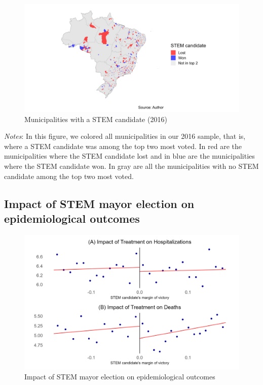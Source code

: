 \documentclass[
  letterpaper,
  DIV=11,
  numbers=noendperiod]{scrartcl}
\begin{document}
\begin{figure}[H]

\caption{Municipalities with a STEM candidate (2016)}

{\centering \includegraphics{outputs/figures/mapa_stem_municipios_2016.png}

}

\end{figure}%

\emph{Notes}: In this figure, we colored all municipalities in our 2016
sample, that is, where a STEM candidate was among the top two most
voted. In red are the municipalities where the STEM candidate lost and
in blue are the municipalities where the STEM candidate won. In gray are
all the municipalities with no STEM candidate among the top two most
voted.

\subsection{Impact of STEM mayor election on epidemiological
outcomes}\label{impact-of-stem-mayor-election-on-epidemiological-outcomes}

\begin{figure}[H]

\caption{Impact of STEM mayor election on epidemiological outcomes}

{\centering \includegraphics{outputs/figures/bigsample_plots_outcomes.png}

}

\end{figure}%
\end{document}
